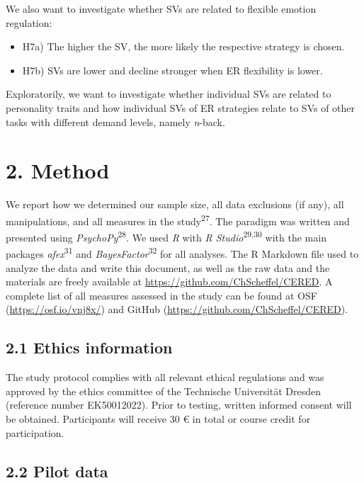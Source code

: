 \documentclass[
  english,
  man,floatsintext]{apa6}
\providecommand{\tightlist}{%
  \setlength{\itemsep}{0pt}\setlength{\parskip}{0pt}}
\begin{document}
We also want to investigate whether SVs are related to flexible emotion regulation:

\begin{itemize}
\tightlist
\item
  H7a) The higher the SV, the more likely the respective strategy is chosen.
\item
  H7b) SVs are lower and decline stronger when ER flexibility is lower.
\end{itemize}

Exploratorily, we want to investigate whether individual SVs are related to personality traits and how individual SVs of ER strategies relate to SVs of other tasks with different demand levels, namely \emph{n}-back.

\hypertarget{method}{%
\section{2. Method}\label{method}}

We report how we determined our sample size, all data exclusions (if any), all manipulations, and all measures in the study\textsuperscript{27}.
The paradigm was written and presented using \emph{PsychoPy}\textsuperscript{28}.
We used \emph{R} with \emph{R Studio}\textsuperscript{29,30} with the main packages \emph{afex}\textsuperscript{31} and \emph{BayesFactor}\textsuperscript{32} for all analyses.
The R Markdown file used to analyze the data and write this document, as well as the raw data and the materials are freely available at \url{https://github.com/ChScheffel/CERED}.
A complete list of all measures assessed in the study can be found at OSF (\url{https://osf.io/vnj8x/}) and GitHub (\url{https://github.com/ChScheffel/CERED}).

\hypertarget{ethics-information}{%
\subsection{2.1 Ethics information}\label{ethics-information}}

The study protocol complies with all relevant ethical regulations and was approved by the ethics committee of the Technische Universität Dresden (reference number EK50012022).
Prior to testing, written informed consent will be obtained.
Participants will receive 30 € in total or course credit for participation.

\hypertarget{pilot-data}{%
\subsection{2.2 Pilot data}\label{pilot-data}}
\end{document}
